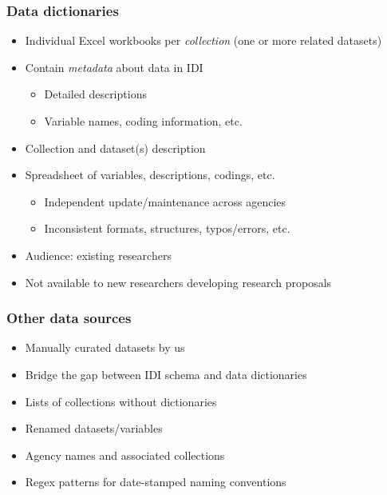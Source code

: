 \documentclass{beamer}
\begin{document}
\begin{frame}
    \frametitle{Data dictionaries}

    \begin{itemize}
        \item Individual Excel workbooks per \emph{collection} (one or more related datasets)
        \item Contain \emph{metadata} about data in IDI
        \begin{itemize}
            \item Detailed descriptions
            \item Variable names, coding information, etc.
        \end{itemize}
        \item Collection and dataset(s) description
        \item Spreadsheet of variables, descriptions, codings, etc.
        \begin{itemize}
            \item Independent update/maintenance across agencies
            \item Inconsistent formats, structures, typos/errors, etc.
        \end{itemize}
        \item Audience: existing researchers
        \item Not available to new researchers developing research proposals

    \end{itemize}

\end{frame}


\begin{frame}
    \frametitle{Other data sources}

    \begin{itemize}
        \item Manually curated datasets by us
        \item Bridge the gap between IDI schema and data dictionaries\\[2em]
        \item Lists of collections without dictionaries
        \item Renamed datasets/variables
        \item Agency names and associated collections
        \item Regex patterns for date-stamped naming conventions
    \end{itemize}
\end{frame}
\end{document}
